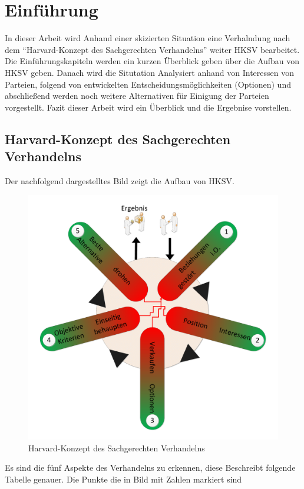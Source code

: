 \chapter{Einführung}
In dieser Arbeit wird Anhand einer skizierten Situation eine Verhalndung nach dem "`Harvard-Konzept des Sachgerechten Verhandelns"'\cite{hk} weiter
HKSV bearbeitet. Die Einführungskapiteln werden ein kurzen Überblick geben über die Aufbau von HKSV\cite{hk} geben. Danach wird die Situtation
Analysiert anhand von Interessen von Parteien, folgend von entwickelten Entscheidungsmöglichkeiten (Optionen) und abschließend werden noch weitere Alternativen für Einigung
der Parteien vorgestellt. Fazit dieser Arbeit wird ein Überblick und die Ergebnise vorstellen.
\section{Harvard-Konzept des Sachgerechten Verhandelns\cite{hk}}
Der nachfolgend dargestelltes Bild zeigt die Aufbau von HKSV\cite{hk}.
\begin{figure}[hb]
\centering
\includegraphics[width=0.4\paperwidth]{pictures/Harvard1}
\caption{Harvard-Konzept des Sachgerechten Verhandelns}
\end{figure}
Es sind die fünf Aspekte des Verhandelns zu erkennen, diese Beschreibt folgende Tabelle genauer. Die Punkte die in Bild mit Zahlen markiert sind
